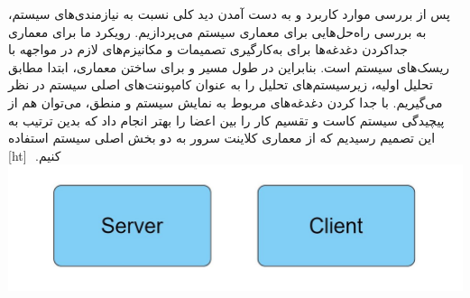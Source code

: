 ‫
‫
‫پس از بررسی موارد کاربرد و به دست آمدن دید کلی نسبت به نیازمندی‌های سیستم، به بررسی راه‌حل‌هایی برای معماری سیستم می‌پردازیم. رویکرد ما برای معماری جداکردن دغدغه‌ها برای به‌کارگیری تصمیمات و مکانیزم‌های لازم در مواجهه با ریسک‌های سیستم است. بنابراین در طول مسیر و برای ساختن معماری،  ابتدا مطابق تحلیل اولیه، زیرسیستم‌های تحلیل را به عنوان کامپوننت‌های اصلی سیستم در نظر می‌گیریم.
‫با جدا کردن دغدغه‌های مربوط به نمایش سیستم و منطق، می‌توان هم از پیچیدگی سیستم کاست و تقسیم کار را بین اعضا را بهتر انجام داد که بدین ترتیب به این تصمیم رسیدیم که از معماری کلاینت سرور به دو بخش اصلی سیستم استفاده کنیم.
‫
‫[ht]
\includegraphics[scale=0.3]{figs/server_client.jpeg}
‫
‫
‫

